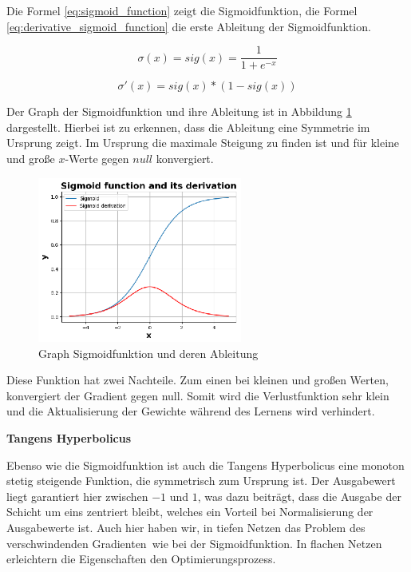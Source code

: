 Die Formel \ref{eq:sigmoid_function} zeigt die Sigmoidfunktion, die Formel \ref{eq:derivative_sigmoid_function} die erste Ableitung der Sigmoidfunktion.

\begin{equation}\label{eq:sigmoid_function}
	\sigma (x) = sig(x) = \frac{1}{1 + e^{-x}}
\end{equation}

\begin{equation}\label{eq:derivative_sigmoid_function}
	\sigma' (x) = sig(x) * (1 - sig(x))
\end{equation}

Der Graph der Sigmoidfunktion und ihre Ableitung ist in Abbildung \ref{img:sig_func_graph} dargestellt. Hierbei ist zu erkennen, dass die Ableitung eine Symmetrie im Ursprung zeigt. Im Ursprung die maximale Steigung zu finden ist und für kleine und große $x$-Werte gegen $null$ konvergiert.

\begin{figure}[!ht]
	\includegraphics[width=0.6\textwidth]{content/chapter_basics/plots/sigmoid_func_plot.eps}
	\centering
	\caption{Graph Sigmoidfunktion und deren Ableitung}
	\label{img:sig_func_graph}
\end{figure}

Diese Funktion hat zwei Nachteile. Zum einen bei kleinen und großen Werten, konvergiert der Gradient gegen null. Somit wird die Verlustfunktion sehr klein und die Aktualisierung der Gewichte während des Lernens wird verhindert.\vspace{0.2cm}

%
\textbf{Tangens Hyperbolicus}\vspace{0.2cm}

Ebenso wie die Sigmoidfunktion ist auch die Tangens Hyperbolicus eine monoton stetig steigende Funktion, die symmetrisch zum Ursprung ist. Der Ausgabewert liegt garantiert hier zwischen $-1$ und $1$, was dazu beiträgt, dass die Ausgabe der Schicht um eins zentriert bleibt, welches ein Vorteil bei Normalisierung der Ausgabewerte ist. Auch hier haben wir, in tiefen Netzen das \glqq Problem des verschwindenden Gradienten\grqq \ wie bei der Sigmoidfunktion. In flachen Netzen erleichtern die Eigenschaften den Optimierungsprozess.\vspace{0.2cm}

